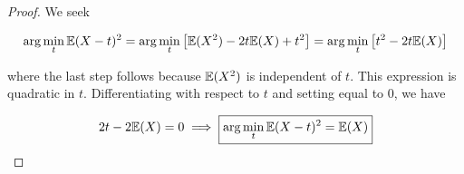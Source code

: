 \begin{proof}


We seek

\[
 \arg \min_t \E(X - t)^2 = \arg \min_t \big[ \E(X^2) - 2t\E(X) + t^2 \big] = \arg \min_t \big[  t^2 - 2t\E(X)\big] 
\]

where the last step follows because \(\E(X^2)\) is independent of \(t\). This expression is quadratic in \(t\). Differentiating with respect to \(t\) and setting equal to 0, we have

\[
2t - 2 \E(X) = 0 \implies \boxed{\arg \min_t \E(X - t)^2 = \E(X)}
\]

\end{proof}



%
%
%
%
%
%
%
%
%

%



